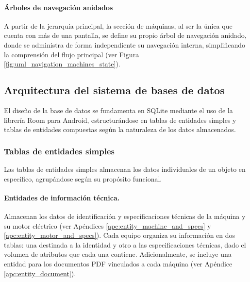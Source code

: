             

            \paragraph{Árboles de navegación anidados}

                A partir de la jerarquía principal, la sección de máquinas, al ser la única que cuenta con más de una pantalla, se define su propio árbol de navegación anidado, donde se administra de forma independiente su navegación interna, simplificando la comprensión del flujo principal (ver Figura \ref{fig:uml_navigation_machines_state}).

                
    
    \subsection{Arquitectura del sistema de bases de datos}

        El diseño de la base de datos se fundamenta en SQLite mediante el uso de la librería Room para Android, estructurándose en tablas de entidades simples y tablas de entidades compuestas según la naturaleza de los datos almacenados.

        \subsubsection{Tablas de entidades simples}

            Las tablas de entidades simples almacenan los datos individuales de un objeto en específico, agrupándose según su propósito funcional.

            \paragraph{Entidades de información técnica.}
            
                Almacenan los datos de identificación y especificaciones técnicas de la máquina y su motor eléctrico (ver Apéndices \ref{apc:entity_machine_and_specs} y \ref{apc:entity_motor_and_specs}). Cada equipo organiza su información en dos tablas: una destinada a la identidad y otro a las especificaciones técnicas, dado el volumen de atributos que cada una contiene. Adicionalmente, se incluye una entidad para los documentos PDF vinculados a cada máquina (ver Apéndice \ref{apc:entity_document}).

